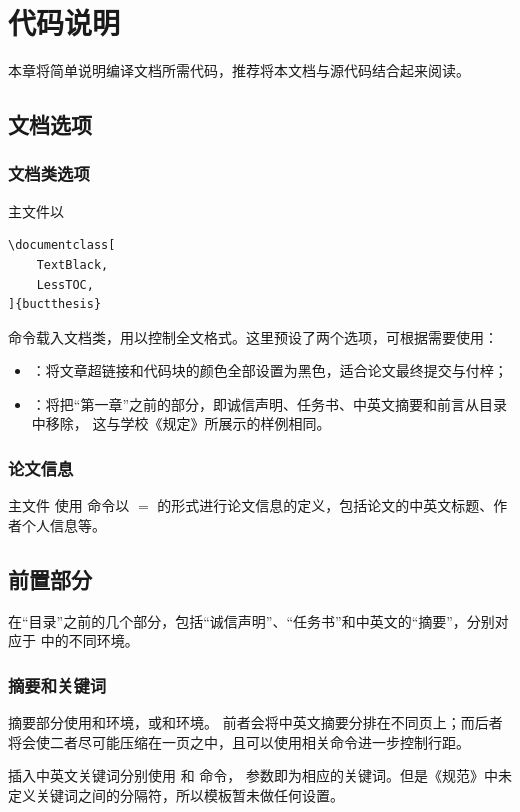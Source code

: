 \chapter{代码说明}\label{chap:CodeIntro}
本章将简单说明编译文档所需代码，推荐将本文档与源代码结合起来阅读。

\section{文档选项}\label{sec:options}
\subsection{文档类选项}
主文件以
\begin{lstlisting}
\documentclass[
	TextBlack,
	LessTOC,
]{buctthesis}
\end{lstlisting}
命令载入文档类，用以控制全文格式。这里预设了两个选项，可根据需要使用：
\begin{itemize}
	\item {}：将文章超链接和代码块的颜色全部设置为黑色，适合论文最终提交与付梓；
	\item {}：将把“第一章”之前的部分，即诚信声明、任务书、中英文摘要和前言从目录中移除，
	这与学校《规定》所展示的样例相同。
\end{itemize}
\subsection{论文信息}\label{subsec:buctsetup}
主文件  使用  命令以 $=$ 的形式进行论文信息的定义，包括论文的中英文标题、作者个人信息等。

\section{前置部分}\label{sec:frontmatter}
在“目录”之前的几个部分，包括“诚信声明”、“任务书”和中英文的“摘要”，分别对应于  中的不同环境。

\subsection{摘要和关键词}\label{subsec:abstract}
摘要部分使用和环境，或和环境。
前者会将中英文摘要分排在不同页上；而后者将会使二者尽可能压缩在一页之中，且可以使用相关命令进一步控制行距。

插入中英文关键词分别使用  和 命令，
参数即为相应的关键词。但是《规范》中未定义关键词之间的分隔符，所以模板暂未做任何设置。

